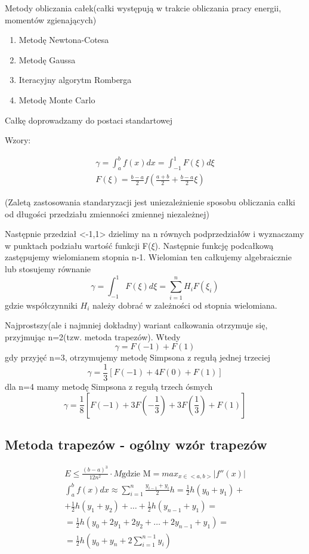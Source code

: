 \documentclass[11pt, a4paper]{article}
\author{}
\date{}
\begin{document}
\maketitle

Metody obliczania całek(całki występują w trakcie obliczania pracy energii, momentów zgienających)


\begin{enumerate}
\item Metodę Newtona-Cotesa
\item Metodę Gaussa
\item Iteracyjny algorytm Romberga
\item Metodę Monte Carlo
\end{enumerate}

Całkę doprowadzamy do postaci standartowej

Wzory:

\begin{gather*}
\gamma = \int_a^bf(x)dx = \int_{-1}^1F(\xi)d\xi\\
F(\xi) = \frac{b-a}{2}f\left(\frac{a+b}{2}+\frac{b-a}{2}\xi \right)
\end{gather*}

(Zaletą zastosowania standaryzacji jest uniezależnienie sposobu obliczania całki od długości przedziału zmienności zmiennej niezależnej)

Następnie przedział <-1,1> dzielimy na n równych podprzedziałów i wyznaczamy w punktach podziału wartość funkcji F($\xi$). Następnie funkcję podcałkową zastępujemy wielomianem stopnia n-1. Wielomian ten całkujemy algebraicznie lub stosujemy równanie
\[
\gamma = \int_{-1}^1F(\xi)d\xi=\sum_{i=1}^nH_iF(\xi_i)
\]
gdzie współczynniki $H_i$ należy dobrać w zależności od stopnia wielomiana.

Najprostszy(ale i najmniej dokładny) wariant całkowania otrzymuje się, przyjmując n=2(tzw. metoda trapezów). Wtedy
\[
\gamma = F(-1) + F(1)
\]
gdy przyjęć n=3, otrzymujemy metodę Simpsona z regułą jednej trzeciej
\[
\gamma = \frac{1}{3}\left[F(-1)+4F(0)+F(1)\right]
\]
dla n=4 mamy metodę Simpsona z regułą trzech ósmych
\[
\gamma = \frac{1}{8}\left[F(-1)+3F(-\frac{1}{3})+3F(\frac{1}{3})+F(1)\right]
\]

\subsection*{Metoda trapezów - ogólny wzór trapezów}
\begin{gather*}
E\leq\frac{(b-a)^3}{12n^2}\cdot M \text{gdzie M} = max_{x\in<a,b>}|f''(x)|\\
\int_a^bf(x)dx\approx\sum_{i=1}^n\frac{y_{i-1}+y_i}{2}h=\frac{1}{2}h(y_0+y_1)+\\
+\frac{1}{2}h(y_1+y_2)+\dots+\frac{1}{2}h(y_{n-1}+y_1)=\\
=\frac{1}{2}h(y_0+2y_1+2y_2+\dots+2y_{n-1}+y_1)=\\
=\frac{1}{2}h(y_0+y_n+2\sum_{i=1}^{n-1}y_i)
\end{gather*}
\end{document}
